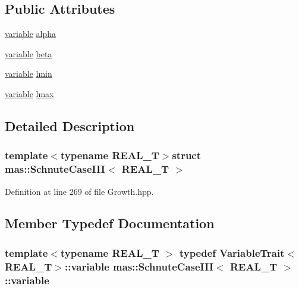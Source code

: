 \subsection*{Public Attributes}
\begin{DoxyCompactItemize}
\item 
\hyperlink{structmas_1_1_schnute_case_i_i_i_a47b89c3219bc40a67dcb3dd626a585fa}{variable} \hyperlink{structmas_1_1_schnute_case_i_i_i_a327d0f288525e7f5c531876245728dcf}{alpha}
\item 
\hyperlink{structmas_1_1_schnute_case_i_i_i_a47b89c3219bc40a67dcb3dd626a585fa}{variable} \hyperlink{structmas_1_1_schnute_case_i_i_i_a857518ba684261d8b0a7bdd08e2c48c3}{beta}
\item 
\hyperlink{structmas_1_1_schnute_case_i_i_i_a47b89c3219bc40a67dcb3dd626a585fa}{variable} \hyperlink{structmas_1_1_schnute_case_i_i_i_a428c1da272df27ab99d278aef25fdb9d}{lmin}
\item 
\hyperlink{structmas_1_1_schnute_case_i_i_i_a47b89c3219bc40a67dcb3dd626a585fa}{variable} \hyperlink{structmas_1_1_schnute_case_i_i_i_a4129bd8069255252549453d2ec3fefb7}{lmax}
\end{DoxyCompactItemize}


\subsection{Detailed Description}
\subsubsection*{template$<$typename R\-E\-A\-L\-\_\-\-T$>$struct mas\-::\-Schnute\-Case\-I\-I\-I$<$ R\-E\-A\-L\-\_\-\-T $>$}



Definition at line 269 of file Growth.\-hpp.



\subsection{Member Typedef Documentation}
\hypertarget{structmas_1_1_schnute_case_i_i_i_a47b89c3219bc40a67dcb3dd626a585fa}{
\subsubsection[{variable}]{\setlength{\rightskip}{0pt plus 5cm}template$<$typename R\-E\-A\-L\-\_\-\-T $>$ typedef {\bf Variable\-Trait}$<$R\-E\-A\-L\-\_\-\-T$>$\-::{\bf variable} {\bf mas\-::\-Schnute\-Case\-I\-I\-I}$<$ R\-E\-A\-L\-\_\-\-T $>$\-::{\bf variable}}}\label{structmas_1_1_schnute_case_i_i_i_a47b89c3219bc40a67dcb3dd626a585fa}


